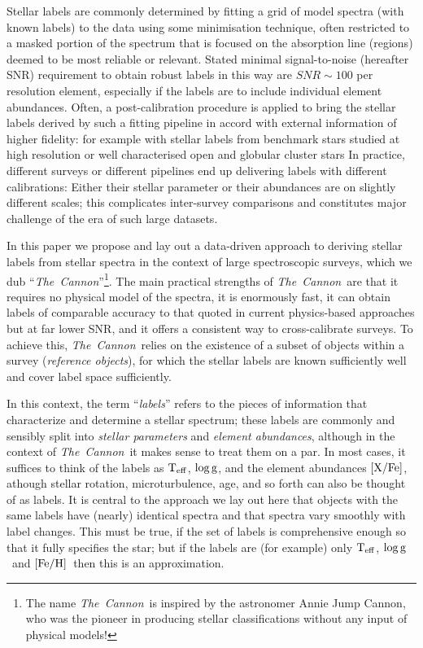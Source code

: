 \documentclass[12pt, preprint]{aastex}
\newcommand{\tc}{\textsl{The~Cannon}}
\newcommand{\teff}{\mbox{$\rm T_{eff}$}}
\newcommand{\feh}{\mbox{$\rm [Fe/H]$}}
\newcommand{\xfe}{\mbox{$\rm [X/Fe]$}}
\newcommand{\logg}{\mbox{$\rm \log g$}}
\begin{document}
Stellar labels are commonly determined by fitting a grid of model spectra (with known labels) to the data using some minimisation technique, often restricted to a masked portion of the spectrum that is focused on the absorption line (regions) deemed to be most reliable or relevant. 
Stated minimal signal-to-noise (hereafter SNR) requirement to obtain robust labels in this way are $SNR\sim 100$ per resolution element, especially if the labels are to include individual element abundances. 
Often, a post-calibration procedure is applied to bring the stellar labels derived by such a fitting pipeline in accord with external information of higher fidelity: for example with stellar labels from benchmark stars studied at high resolution or well characterised open and globular cluster stars \citep[e.g.,][]{Meszaros2013, Kord2013}
In practice, different surveys or different pipelines end up delivering labels with different calibrations:
Either their stellar parameter or their abundances are on slightly different scales; this complicates
inter-survey comparisons and constitutes major challenge of the era of such large datasets. 

In this paper we propose and lay out a data-driven approach to deriving stellar labels from stellar spectra in the context of large spectroscopic surveys,
which we dub ``\tc''\footnote{The name \tc\ is inspired by the astronomer Annie Jump Cannon,
who was the pioneer in producing stellar classifications without any input of physical models!}.
The main practical strengths of \tc\ are that it requires no physical model of the spectra, it is enormously fast, it can obtain labels of comparable accuracy to that quoted in current physics-based approaches
 but at far lower SNR, and it offers a consistent way to cross-calibrate surveys. 
To achieve this, \tc\ relies on the existence of a subset of objects within a survey
(\textit{reference objects}), for which the stellar labels are known sufficiently well and cover label space sufficiently.

In this context, the term ``\emph{labels}'' refers to the pieces of information
that characterize and determine a stellar spectrum; these labels are commonly and sensibly split into \emph{stellar parameters} and \emph{element abundances}, although in the context of \tc\ it makes sense to treat them on a par. 
In most cases, it suffices to think of the labels as \teff , \logg, and the element abundances \xfe, athough stellar rotation, microturbulence, age, and so forth can also be thought of as labels.
It is central to the approach we lay out here that objects with the same labels have (nearly) identical spectra and that spectra vary smoothly with label changes. 
This must be true, if the set of labels is comprehensive enough so that it fully specifies the star; but if the labels are (for example) only \teff, \logg\ and \feh\ then this is an approximation.
\end{document}
